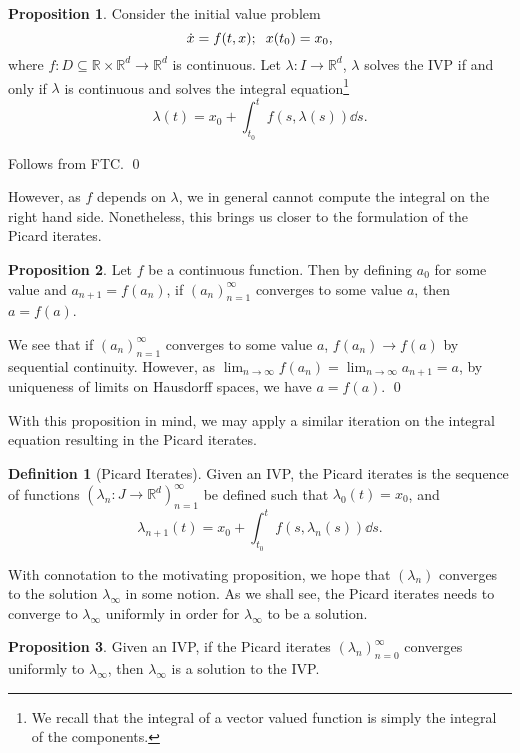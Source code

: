 \documentclass[
]{article}
\theoremstyle{definition}
\newtheorem{prop}{Proposition}
\theoremstyle{definition}
\newtheorem{definition}{Definition}[section]
\begin{document}
\begin{prop}\label{alt_repr}
  Consider the initial value problem 
  \[\dot x = f(t, x); \hspace{2mm} x(t_0) = x_0,\]
  where \(f : D \subseteq \mathbb{R} \times \mathbb{R}^d \to \mathbb{R}^d\) is 
  continuous. Let \(\lambda : I \to \mathbb{R}^d\), \(\lambda\) solves the IVP 
  if and only if \(\lambda\) is continuous and solves the integral 
  equation\footnote{We recall that the integral of a vector valued function is 
  simply the integral of the components.} 
  \[\lambda(t) = x_0 + \int_{t_0}^t f(s, \lambda(s)) \dd s.\]
\end{prop}
\proof

Follows from FTC. \qed

However, as \(f\) depends on \(\lambda\), we in general cannot compute
the integral on the right hand side. Nonetheless, this brings us closer
to the formulation of the Picard iterates.

\begin{prop}
  Let \(f\) be a continuous function. Then by defining \(a_0\) for some value and 
  \(a_{n + 1} = f(a_n)\), if \((a_n)_{n = 1}^\infty\) converges to some value 
  \(a\), then \(a = f(a)\).
\end{prop}
\proof

We see that if \((a_n)_{n = 1}^\infty\) converges to some value \(a\),
\(f(a_n) \to f(a)\) by sequential continuity. However, as
\(\lim_{n \to \infty} f(a_n) = \lim_{n \to \infty} a_{n + 1} = a\), by
uniqueness of limits on Hausdorff spaces, we have \(a = f(a)\). \qed

With this proposition in mind, we may apply a similar iteration on the
integral equation resulting in the Picard iterates.

\begin{definition}[Picard Iterates]
  Given an IVP, the Picard iterates is the sequence of functions 
  \((\lambda_n : J \to \mathbb{R}^d)_{n = 1}^\infty\) be defined such that 
  \(\lambda_0(t) = x_0\), and 
  \[\lambda_{n + 1}(t) = x_0 + \int_{t_0}^t f(s, \lambda_n(s)) \dd s.\]
\end{definition}

With connotation to the motivating proposition, we hope that
\((\lambda_n)\) converges to the solution \(\lambda_\infty\) in some
notion. As we shall see, the Picard iterates needs to converge to
\(\lambda_\infty\) uniformly in order for \(\lambda_\infty\) to be a
solution.

\begin{prop}
  Given an IVP, if the Picard iterates \((\lambda_n)_{n = 0}^\infty\) converges 
  uniformly to \(\lambda_\infty\), then \(\lambda_\infty\) is a solution to the 
  IVP.
\end{prop}
\proof
\end{document}
